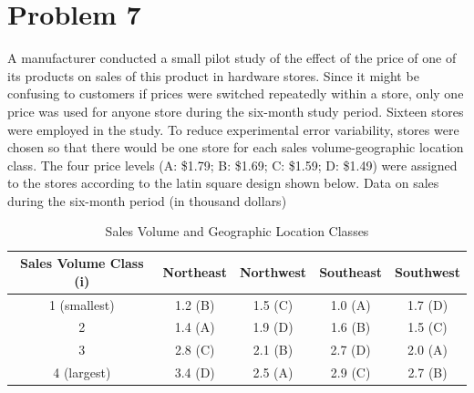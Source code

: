 \documentclass{article}
\begin{document}
\section{Problem 7}
A manufacturer conducted a small pilot study of the effect of the price of one of its products on
sales of this product in hardware stores. Since it might be confusing to customers if prices were
switched repeatedly within a store, only one price was used for anyone store during the six-month
study period. Sixteen stores were employed in the study. To reduce experimental error variability,
stores were chosen so that there would be one store for each sales volume-geographic location class.
The four price levels (A: \$1.79; B: \$1.69; C: \$1.59; D: \$1.49) were assigned to the stores according
to the latin square design shown below. Data on sales during the six-month period (in thousand
dollars)

\begin{table}[!ht]
	\centering
	\caption{Sales Volume and Geographic Location Classes}
	\begin{tabular}{c c c c c}
		\hline
		\textbf{Sales Volume Class (i)} & \textbf{Northeast} & \textbf{Northwest} & \textbf{Southeast} & \textbf{Southwest} \\
		\hline
		1 (smallest)                    & 1.2 (B)            & 1.5 (C)            & 1.0 (A)            & 1.7 (D)            \\
		2                               & 1.4 (A)            & 1.9 (D)            & 1.6 (B)            & 1.5 (C)            \\
		3                               & 2.8 (C)            & 2.1 (B)            & 2.7 (D)            & 2.0 (A)            \\
		4 (largest)                     & 3.4 (D)            & 2.5 (A)            & 2.9 (C)            & 2.7 (B)            \\
		\hline
	\end{tabular}
\end{table}
\end{document}
